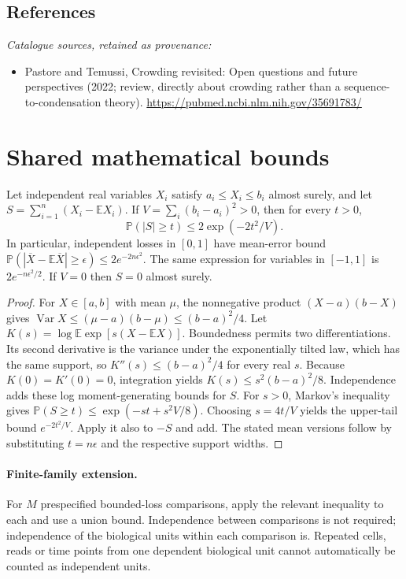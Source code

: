 \documentclass[11pt]{article}
\begin{document}
\subsection{References}
\noindent\emph{Catalogue sources, retained as provenance:}
\begin{itemize}
\item Pastore and Temussi, Crowding revisited: Open questions and future perspectives (2022; review, directly about crowding rather than a sequence-to-condensation theory). \url{https://pubmed.ncbi.nlm.nih.gov/35691783/}
\end{itemize}




\section{Shared mathematical bounds}\label{app:bounds}
\begin{lemma}\label{lem:bounded}
Let independent real variables $X_i$ satisfy $a_i\leq X_i\leq b_i$ almost surely,
and let $S=\sum_{i=1}^n(X_i-\mathbb{E} X_i)$. If
$V=\sum_i(b_i-a_i)^2>0$, then for every $t>0$,
\[
 \mathbb{P}(|S|\geq t)\leq 2\exp(-2t^2/V).
\]
In particular, independent losses in $[0,1]$ have mean-error bound
$\mathbb{P}(|\overline X-\mathbb{E}\overline X|\geq\epsilon)
\leq2e^{-2n\epsilon^2}$. The same expression for variables in $[-1,1]$
is $2e^{-n\epsilon^2/2}$. If $V=0$ then $S=0$ almost surely.
\end{lemma}
\begin{proof}
For $X\in[a,b]$ with mean $\mu$, the nonnegative product
$(X-a)(b-X)$ gives
$\operatorname{Var} X\leq(\mu-a)(b-\mu)\leq(b-a)^2/4$.
Let $K(s)=\log\mathbb{E}\exp[s(X-\mathbb{E} X)]$.
Boundedness permits two differentiations. Its second derivative is the variance
under the exponentially tilted law, which has the same support, so
$K''(s)\leq(b-a)^2/4$ for every real $s$.
Because $K(0)=K'(0)=0$, integration yields
$K(s)\leq s^2(b-a)^2/8$.
Independence adds these log moment-generating bounds for $S$.
For $s>0$, Markov's inequality gives
$\mathbb{P}(S\geq t)\leq\exp(-st+s^2V/8)$.
Choosing $s=4t/V$ yields the upper-tail bound $e^{-2t^2/V}$.
Apply it also to $-S$ and add. The stated mean versions follow by substituting
$t=n\epsilon$ and the respective support widths.
\end{proof}

\paragraph{Finite-family extension.}
For $M$ prespecified bounded-loss comparisons, apply the relevant inequality to
each and use a union bound. Independence between comparisons is not required;
independence of the biological units within each comparison is. Repeated cells,
reads or time points from one dependent biological unit cannot automatically be
counted as independent units.
\end{document}
